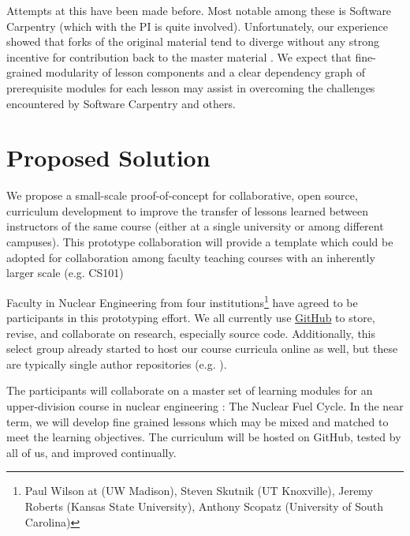 \documentclass[11pt]{article}
\begin{document}
          Attempts at this have been made before. Most notable among 
          these is Software Carpentry (which with the PI is quite involved). 
          Unfortunately, our experience showed that 
          forks of the original material tend to diverge without any strong 
          incentive for contribution back to the master material 
          \cite{wilson_software_2014,wilson_software_2014-1}. We expect that fine-grained modularity 
          of lesson components and a clear dependency graph of prerequisite 
          modules for each lesson may assist in overcoming the challenges 
          encountered by Software Carpentry and others.

          \section*{Proposed Solution}
          We propose a small-scale proof-of-concept for collaborative, open 
          source, curriculum development to improve the transfer of lessons 
          learned between instructors of the same course (either at a single 
          university or among different campuses). This prototype collaboration 
          will provide a template which could be adopted for collaboration 
          among faculty teaching courses with an inherently larger scale (e.g. 
          CS101)

          Faculty in Nuclear Engineering from four institutions\footnote{Paul 
          Wilson at (UW Madison), Steven Skutnik (UT Knoxville), Jeremy Roberts 
          (Kansas State University), Anthony Scopatz (University of South 
          Carolina)} have agreed to be participants in 
          this prototyping effort. We all currently use 
          \href{https://github.com}{GitHub} to store, 
          revise, and collaborate on research, especially source code. 
          Additionally, this select group already started to host our course 
          curricula online as well, but these are typically single author 
          repositories (e.g. \cite{huff_npre412_2017}).

          The participants will collaborate on a master set of learning 
          modules for an upper-division course in nuclear engineering : 
          The Nuclear Fuel Cycle. In the near term, we will develop fine 
          grained lessons which may be mixed and matched to meet the 
          learning objectives. The curriculum will be hosted on GitHub, 
          tested by all of us, and improved continually.
\end{document}
